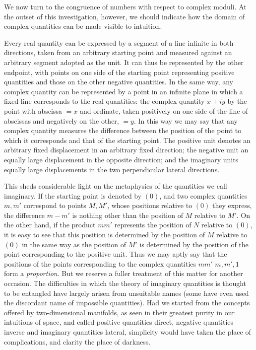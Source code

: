 We now turn to the congruence of numbers with respect to complex moduli. At the outset of this investigation, however, we should indicate how the domain of complex quantities can be made visible to intuition.

Every real quantity can be expressed by a segment of a line infinite in both directions, taken from an arbitrary starting point and measured against an arbitrary segment adopted as the unit. It can thus be represented by the other endpoint, with points on one side of the starting point representing positive quantities and those on the other negative quantities. In the same way, any complex quantity can be represented by a point in an infinite plane in which a fixed line corresponds to the real quantities: the complex quantity $x+iy$ by the point with abscissa $=x$ and ordinate, taken positively on one side of the line of abscissas and negatively on the other, $=y$. In this way we may say that any complex quantity measures the difference between the position of the point to which it corresponds and that of the starting point. The positive unit denotes an arbitrary fixed displacement in an arbitrary fixed direction; the negative unit an equally large displacement in the opposite direction; and the imaginary units equally large displacements in the two perpendicular lateral directions.

This sheds considerable light on the metaphysics of the quantities we call imaginary. If the starting point is denoted by $(0)$, and two complex quantities $m,m'$ correspond to points $M,M'$, whose positions relative to $(0)$ they express, the difference $m-m'$ is nothing other than the position of $M$ relative to $M'$. On the other hand, if the product $mm'$ represents the position of $N$ relative to $(0)$, it is easy to see that this position is determined by the position of $M$ relative to $(0)$ in the same way as the position of $M'$ is determined by the position of the point corresponding to the positive unit. Thus we may aptly say that the positions of the points corresponding to the complex quantities $mm'$
%
$m,m',1$ form a \emph{proportion}. But we reserve a fuller treatment of this matter for another occasion. The difficulties in which the theory of imaginary quantities is thought to be entangled have largely arisen from unsuitable names (some have even used the discordant name of impossible quantities). Had we started from the concepts offered by two-dimensional manifolds, as seen in their greatest purity in our intuitions of space, and called positive quantities direct, negative quantities inverse and imaginary quantities lateral, simplicity would have taken the place of complications, and clarity the place of darkness.

